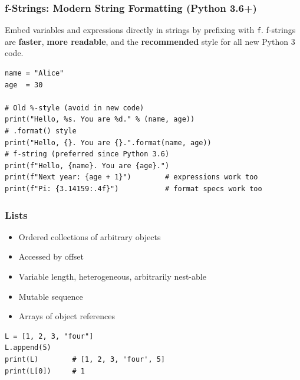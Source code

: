 \begin{frame}[fragile]\frametitle{f-Strings: Modern String Formatting (Python 3.6+)}
Embed variables and expressions directly in strings by prefixing with \texttt{f}. f-strings are \textbf{faster}, \textbf{more readable}, and the \textbf{recommended} style for all new Python 3 code.
\begin{lstlisting}
name = "Alice"
age  = 30

# Old %-style (avoid in new code)
print("Hello, %s. You are %d." % (name, age))
# .format() style
print("Hello, {}. You are {}.".format(name, age))
# f-string (preferred since Python 3.6)
print(f"Hello, {name}. You are {age}.")
print(f"Next year: {age + 1}")        # expressions work too
print(f"Pi: {3.14159:.4f}")           # format specs work too
\end{lstlisting}
\end{frame}

\begin{frame}[fragile]\frametitle{Lists}
  \begin{itemize}
  \item Ordered collections of arbitrary objects
  \item Accessed by offset
  \item Variable length, heterogeneous, arbitrarily nest-able
  \item Mutable sequence
  \item Arrays of object references
  \end{itemize}
  \begin{lstlisting}
L = [1, 2, 3, "four"]
L.append(5)
print(L)        # [1, 2, 3, 'four', 5]
print(L[0])     # 1
  \end{lstlisting}
\end{frame}

